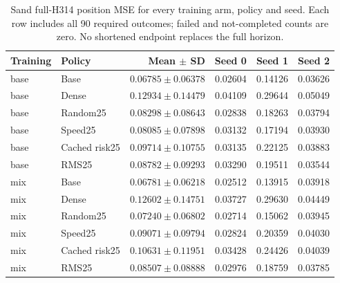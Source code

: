 \begin{table}[t]
\centering\scriptsize
\caption{Sand full-H314 position MSE for every training arm, policy and seed. Each row includes all 90 required outcomes; failed and not-completed counts are zero. No shortened endpoint replaces the full horizon.}
\label{tab:sand-all-rollouts}
\setlength{\tabcolsep}{3pt}
\begin{tabular}{llrrrr}
\toprule
Training & Policy & Mean $\pm$ SD & Seed 0 & Seed 1 & Seed 2\\
\midrule
base & Base & $0.06785\pm0.06378$ & 0.02604 & 0.14126 & 0.03626\\
base & Dense & $0.12934\pm0.14479$ & 0.04109 & 0.29644 & 0.05049\\
base & Random25 & $0.08298\pm0.08643$ & 0.02838 & 0.18263 & 0.03794\\
base & Speed25 & $0.08085\pm0.07898$ & 0.03132 & 0.17194 & 0.03930\\
base & Cached risk25 & $0.09714\pm0.10755$ & 0.03135 & 0.22125 & 0.03883\\
base & RMS25 & $0.08782\pm0.09293$ & 0.03290 & 0.19511 & 0.03544\\
mix & Base & $0.06781\pm0.06218$ & 0.02512 & 0.13915 & 0.03918\\
mix & Dense & $0.12602\pm0.14751$ & 0.03727 & 0.29630 & 0.04449\\
mix & Random25 & $0.07240\pm0.06802$ & 0.02714 & 0.15062 & 0.03945\\
mix & Speed25 & $0.09071\pm0.09794$ & 0.02824 & 0.20359 & 0.04030\\
mix & Cached risk25 & $0.10631\pm0.11951$ & 0.03428 & 0.24426 & 0.04039\\
mix & RMS25 & $0.08507\pm0.08888$ & 0.02976 & 0.18759 & 0.03785\\
\bottomrule
\end{tabular}
\end{table}
